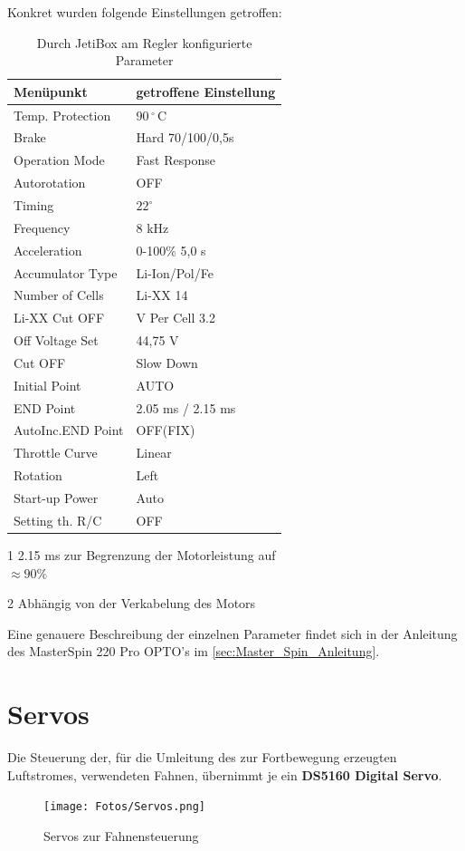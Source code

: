 Konkret wurden folgende Einstellungen getroffen:\\
\begin{table}[h]
\centering
\begin{threeparttable}
    
    \begin{tabular}{|l|l|}
    \hline
     Menüpunkt & getroffene Einstellung \\\hline
     Temp. Protection & $90\,^\circ\,\textrm{C}$\\
     Brake & Hard 70/100/0,5s\\
     Operation Mode & Fast Response\\
     Autorotation & OFF\\
     Timing & $22^\circ$\\
     Frequency & 8 kHz\\
     Acceleration & 0-100\% 5,0 s\\
     Accumulator Type & Li-Ion/Pol/Fe\\
     Number of Cells & Li-XX 14\\
     Li-XX Cut OFF & V Per Cell 3.2\\
     Off Voltage Set & 44,75 V\\
     Cut OFF & Slow Down\\
     Initial Point & AUTO\\
     END Point & 2.05 ms / 2.15 ms \tnote{1}\\
     AutoInc.END Point & OFF(FIX)\\
     Throttle Curve & Linear\\
     Rotation & Left \tnote{2}\\
     Start-up Power & Auto\\
     Setting th. R/C & OFF\\\hline
    \end{tabular}
    \begin{tablenotes}\footnotesize 
        \item[1] 2.15 ms zur Begrenzung der Motorleistung auf \\$\approx 90\%$
        \item[2] Abhängig von der Verkabelung des Motors 
        \end{tablenotes}
    \end{threeparttable}
    \caption{Durch JetiBox am Regler konfigurierte Parameter}
\end{table}

Eine genauere Beschreibung der einzelnen Parameter findet sich in der Anleitung des MasterSpin 220 Pro OPTO's im \autoref{sec:Master_Spin_Anleitung}.

\newpage
\section{Servos\label{sec:servos}}
Die Steuerung der, für die Umleitung des zur Fortbewegung erzeugten Luftstromes, verwendeten Fahnen, übernimmt je ein \textbf{DS5160 Digital Servo}.
\begin{figure}[h]
    \centering
    \texttt{[image: Fotos/Servos.png]}
    \caption{Servos zur Fahnensteuerung}
\end{figure}

\newpage